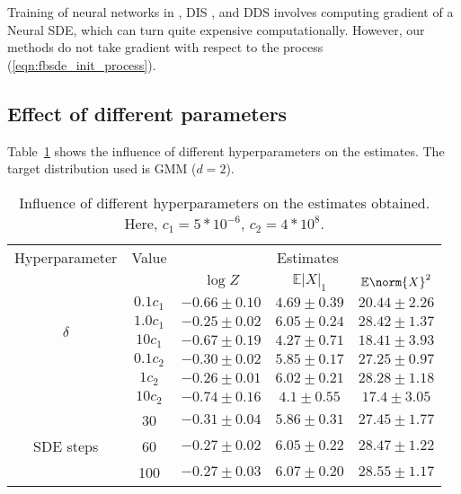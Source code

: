  Training of neural networks in \cite{zhang_path_2022}, DIS \cite{berner_optimal_2023}, and DDS \cite{vargas_denoising_2022} involves computing gradient of a Neural SDE, which can turn quite expensive computationally. However, our methods do not take gradient with respect to the process (\ref{eqn:fbsde_init_process}).  

 \subsection{Effect of different parameters}\label{sec:ablation}
 Table~\ref{tab:ablation} shows the influence of different hyperparameters on the estimates. The target distribution used is GMM ($d=2$).
 \begin{table}[!htb]
\caption{Influence of different hyperparameters on the estimates obtained. Here, $c_1 = 5*10^{-6}$, $c_2=4*10^{8}$.}
    \centering
    \begin{tabular}{ccccc}
        \toprule
         Hyperparameter & Value & \multicolumn{3}{c}{Estimates}\\
         \cmidrule(r){3-5}
         & & $\log Z$ & $\mathbb{E}|X|_1$ & $\mathbb{E}\norm{X}^2$\\
         \midrule
        \multirow{4}{*}{$\delta$} & $0.1c_1$ & $-0.66 \pm 0.10$ & $4.69 \pm 0.39$ & $20.44 \pm 2.26$\\
        & $1.0c_1$ & $-0.25 \pm 0.02$ & $6.05 \pm 0.24$ & $28.42 \pm 1.37$\\
        & $10c_1$ & $-0.67 \pm 0.19$ & $4.27 \pm 0.71$ & $18.41 \pm 3.93$ \\
        \midrule
        \multirow{4}{*}{$\lambda$} & $0.1c_2$ & $-0.30 \pm 0.02$ & $5.85 \pm 0.17$ & $27.25 \pm 0.97$\\
        & $1c_2$ & $-0.26 \pm 0.01$ & $6.02 \pm 0.21$ & $28.28 \pm 1.18$\\
        & $10c_2$ & $-0.74 \pm 0.16$ & $4.1 \pm 0.55$ & $17.4 \pm 3.05$ \\
        \midrule
        \multirow{4}{*}{SDE steps} & 30 & $-0.31 \pm 0.04$ & $5.86 \pm 0.31$ & $27.45 \pm 1.77$\\
        & 60 & $-0.27 \pm 0.02$ & $6.05 \pm 0.22$ & $28.47 \pm 1.22$\\
        & 100 & $-0.27 \pm 0.03$ & $6.07 \pm 0.20$ & $28.55 \pm 1.17$ \\
        \bottomrule
      \end{tabular}
    \label{tab:ablation}
\end{table}
 
 
